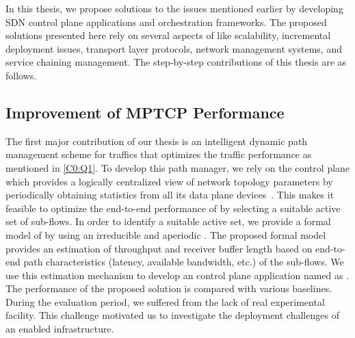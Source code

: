 In this thesis, we propose solutions to the issues mentioned earlier by developing SDN control plane applications and orchestration frameworks. The proposed solutions presented here rely on several aspects of  like scalability, incremental deployment issues, transport layer protocols, network management systems, and service chaining management. The step-by-step contributions of this thesis are as follows.
\subsection{Improvement of MPTCP Performance}
The first major contribution of our thesis is an intelligent dynamic path management scheme for  traffics that optimizes the traffic performance as mentioned in \cref{C0:Q1}. To develop this path manager, we rely on the  control plane which provides a logically centralized view of network topology parameters by periodically obtaining statistics from all its data plane devices~\cite{nunes2014survey}. This makes it feasible to optimize the end-to-end performance of  by selecting a suitable active set of  sub-flows. In order to identify a suitable active set, we provide a formal model of  by using an irreducible and aperiodic . The proposed formal model provides an estimation of  throughput and receiver buffer length based on end-to-end path characteristics (latency, available bandwidth, etc.) of the sub-flows. We use this estimation mechanism to develop an  control plane application named as . The performance of the proposed solution is compared with various baselines. During the evaluation period, we suffered from the lack of real  experimental facility. This challenge motivated us to investigate the deployment challenges of an  enabled  infrastructure.

